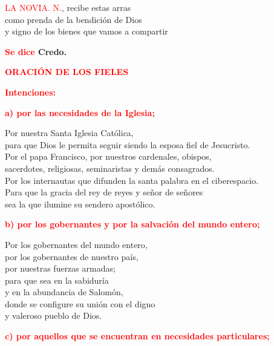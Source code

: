 \documentclass[12pt, letterpaper, spanish]{report}
\begin{document}
\textcolor{red}{LA NOVIA.} \newline
\textcolor{red}{N.}, recibe estas arras \\
como prenda de la bendici\'on de Dios \\
y signo de los bienes que vamos a compartir \newline

\Large {\bfseries \textcolor{red}{Se dice} Credo.} \newline

\newpage

\Large {\bfseries \textcolor{red}{ORACI\'ON DE LOS FIELES}} \newline

\large {\bfseries \textcolor{red}{Intenciones:}} \newline

\large {\bfseries \textcolor{red}{a) por las necesidades de la Iglesia;}} \newline

\Large Por nuestra Santa Iglesia Cat\'olica,\\ 
para que Dios le permita seguir siendo la esposa fiel de Jesucristo.\\ 
Por el papa Francisco, por nuestros cardenales, obispos, \\
sacerdotes, religiosas, seminaristas y dem\'as consagrados. \\
Por los internautas que difunden la santa palabra en el ciberespacio.\\ 
Para que la gracia del rey de reyes y se\~nor de se\~nores \\
sea la que ilumine su sendero apost\'olico.\newline

\large {\bfseries \textcolor{red}{b) por los gobernantes y por la salvaci\'on del mundo entero;}} \newline

\Large Por los gobernantes del mundo entero, \\
por los gobernantes de nuestro pa\'is, \\
por nuestras fuerzas armadas; \\
para que sea en la sabidur\'ia \\
y en la abundancia de Salom\'on, \\
donde se configure su uni\'on con el digno \\
y valeroso pueblo de Dios.\newline

\large {\bfseries \textcolor{red}{c) por aquellos que se encuentran en necesidades particulares;}} \newline
\end{document}
